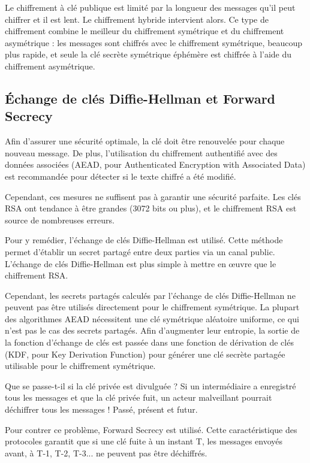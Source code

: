 Le chiffrement à clé publique est limité par la longueur des messages qu'il peut chiffrer et il est lent. Le chiffrement hybride intervient alors. Ce type de chiffrement combine le meilleur du chiffrement symétrique et du chiffrement asymétrique : les messages sont chiffrés avec le chiffrement symétrique, beaucoup plus rapide, et seule la clé secrète symétrique éphémère est chiffrée à l'aide du chiffrement asymétrique.

\subsection{Échange de clés Diffie-Hellman et Forward Secrecy}

Afin d'assurer une sécurité optimale, la clé doit être renouvelée pour chaque nouveau message. De plus, l'utilisation du chiffrement authentifié avec des données associées (AEAD, pour Authenticated Encryption with Associated Data) est recommandée pour détecter si le texte chiffré a été modifié.

Cependant, ces mesures ne suffisent pas à garantir une sécurité parfaite. Les clés \gls{RSA} ont tendance à être grandes (3072 bits ou plus), et le chiffrement \gls{RSA} est source de nombreuses erreurs.

Pour y remédier, l'échange de clés Diffie-Hellman est utilisé. Cette méthode permet d'établir un secret partagé entre deux parties via un canal public. L'échange de clés Diffie-Hellman est plus simple à mettre en \oe{}uvre que le chiffrement \gls{RSA}.

Cependant, les secrets partagés calculés par l'échange de clés Diffie-Hellman ne peuvent pas être utilisés directement pour le chiffrement symétrique. La plupart des algorithmes AEAD nécessitent une clé symétrique aléatoire uniforme, ce qui n'est pas le cas des secrets partagés. Afin d'augmenter leur entropie, la sortie de la fonction d'échange de clés est passée dans une fonction de dérivation de clés (KDF, pour Key Derivation Function) pour générer une clé secrète partagée utilisable pour le chiffrement symétrique.

Que se passe-t-il si la clé privée est divulguée ? Si un intermédiaire a enregistré tous les messages et que la clé privée fuit, un acteur malveillant pourrait déchiffrer tous les messages ! Passé, présent et futur.

Pour contrer ce problème, Forward Secrecy est utilisé. Cette caractéristique des protocoles garantit que si une clé fuite à un instant T, les messages envoyés avant, à T-1, T-2, T-3... ne peuvent pas être déchiffrés.

